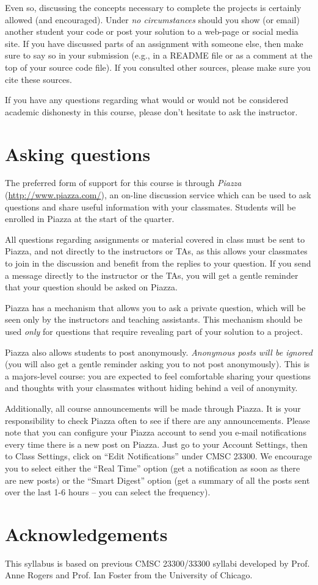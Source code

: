 \documentclass[11pt]{article}
\begin{document}
Even so, discussing the concepts necessary to complete the projects is certainly allowed (and encouraged).  Under \emph{no circumstances} should you show (or email) another student your code or post your solution to a web-page or social media site.  If you have discussed parts of an assignment with someone else, then make sure to say so in your submission (e.g., in a README file or as a comment at the top of your source code file). If you consulted other sources, please make sure you cite these sources.

If you have any questions regarding what would or would not be considered academic dishonesty in this course, please don't hesitate to ask the instructor.


\section{Asking questions}
\label{asking}

The preferred form of support for this course is through \emph{Piazza} (\url{http://www.piazza.com/}), an on-line discussion service which can be used to ask questions and share useful information with your classmates. Students will be enrolled in Piazza at the start of the quarter.

All questions regarding assignments or material covered in class must be sent to Piazza, and not directly to the instructors or TAs, as this allows your classmates to join in the discussion and benefit from the replies to your question. If you send a message directly to the instructor or the TAs, you will get a gentle reminder that your question should be asked on Piazza. 

Piazza has a mechanism that allows you to ask a private question, which will be seen only by the instructors and teaching assistants. This mechanism should be used \emph{only} for questions that require revealing part of your solution to a project.

Piazza also allows students to post anonymously. \emph{Anonymous posts will be ignored} (you will also get a gentle reminder asking you to not post anonymously). This is a majors-level course: you are expected to feel comfortable sharing your questions and thoughts with your classmates without hiding behind a veil of anonymity.

Additionally, all course announcements will be made through Piazza.
It is your responsibility to check Piazza often to see if there are
any announcements. Please note that you can configure your Piazza account
to send you e-mail notifications every time there is a new post on
Piazza. Just go to your Account Settings, then to Class Settings, 
click on ``Edit Notifications'' under CMSC 23300. We 
encourage you to select either the ``Real Time'' option (get a notification
as soon as there are new posts) or the ``Smart Digest'' option (get
a summary of all the posts sent over the last 1-6 hours -- you can select
the frequency).


\section{Acknowledgements}

This syllabus is based on previous CMSC 23300/33300 syllabi developed by Prof. Anne Rogers and Prof. Ian Foster from the University of Chicago.
\end{document}

